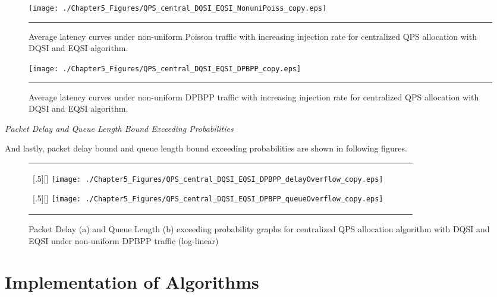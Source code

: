 \begin{figure}[htbp]
  \centering
    \texttt{[image: ./Chapter5\_Figures/QPS\_central\_DQSI\_EQSI\_NonuniPoiss\_copy.eps]}
    \rule{35em}{0.5pt}
  \caption[Centralized QPS DQSI and EQSI allocation average latency under non-uniform Poisson]{Average latency curves under non-uniform Poisson traffic with increasing injection rate for centralized QPS allocation with DQSI and EQSI algorithm.}
  \label{fig:Electron}
\end{figure}


\begin{figure}[htbp]
  \centering
    \texttt{[image: ./Chapter5\_Figures/QPS\_central\_DQSI\_EQSI\_DPBPP\_copy.eps]}
    \rule{35em}{0.5pt}
  \caption[centralized QPS DQSI and EQSI allocation average latency under non-uniform DPBPP]{Average latency curves under non-uniform DPBPP traffic with increasing injection rate for centralized QPS allocation with DQSI and EQSI algorithm.}
  \label{fig:Electron} 
\end{figure}

\pagebreak

\textit{Packet Delay and Queue Length Bound Exceeding Probabilities}



And lastly, packet delay bound and queue length bound exceeding probabilities are shown in following figures. 

\begin{figure*}[htbp]
  \centering
  \begin{tabular}[c]{cccc}

  \subcaptionbox{}[.5\linewidth][]{%
    \texttt{[image: ./Chapter5\_Figures/QPS\_central\_DQSI\_EQSI\_DPBPP\_delayOverflow\_copy.eps]} }	
    
  \subcaptionbox{}[.5\linewidth][]{%
    \texttt{[image: ./Chapter5\_Figures/QPS\_central\_DQSI\_EQSI\_DPBPP\_queueOverflow\_copy.eps]}}
 
   \end{tabular}

  \caption{Packet Delay (a) and Queue Length (b) exceeding probability graphs for centralized QPS allocation algorithm with DQSI and EQSI under non-uniform DPBPP traffic (log-linear)}
\end{figure*}

\section{Implementation of Algorithms}

